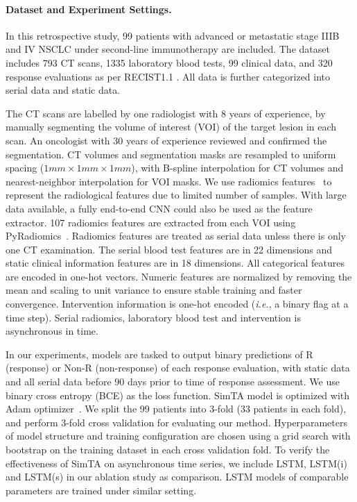 \documentclass[runningheads]{llncs}
\newcommand{\ie}{\textit{i.e.}}
\begin{document}
\paragraph{\textbf{Dataset and Experiment Settings.}}

In this retrospective study, 99 patients with advanced or metastatic stage IIIB and IV NSCLC under second-line immunotherapy are included. The dataset includes 793 CT scans, 1335 laboratory blood tests, 99 clinical data, and 320 response evaluations as per RECIST1.1 \cite{Eisenhauer2009NewRE}. All data is further categorized into serial data and static data.

The CT scans are labelled by one radiologist with 8 years of experience, by manually segmenting the volume of interest (VOI) of the target lesion in each scan. An oncologist with 30 years of experience reviewed and confirmed the segmentation. CT volumes and segmentation masks are resampled to uniform spacing ($1mm \times 1mm \times 1mm$), with B-spline interpolation for CT volumes and nearest-neighbor interpolation for VOI masks. We use radiomics features~\cite{Gillies2016RadiomicsIA} to represent the radiological features due to limited number of samples. With large data available, a fully end-to-end CNN could also be used as the feature extractor. 107 radiomics features are extracted from each VOI using PyRadiomics~\cite{Griethuysen2017ComputationalRS}. Radiomics features are treated as serial data unless there is only one CT examination. The serial blood test features are in 22 dimensions and static clinical information features are in 18 dimensions. All categorical features are encoded in one-hot vectors. Numeric features are normalized by removing the mean and scaling to unit variance to ensure stable training and faster convergence. Intervention information is one-hot encoded (\ie, a binary flag at a time step). Serial radiomics, laboratory blood test and intervention is asynchronous in time.

In our experiments, models are tasked to output binary predictions of R (response) or Non-R (non-response) of each response evaluation, with static data and all serial data before 90 days prior to time of response assessment. We use binary cross entropy (BCE) as the loss function. SimTA model is optimized with Adam optimizer~\cite{Kingma2014AdamAM}. We split the 99 patients into 3-fold (33 patients in each fold), and perform 3-fold cross validation for evaluating our method. Hyperparameters of model structure and training configuration are chosen using a grid search with bootstrap on the training dataset in each cross validation fold. To verify the effectiveness of SimTA on asynchronous time series, we include LSTM, LSTM(i) and LSTM(s) in our ablation study as comparison. LSTM models of comparable parameters are trained under similar setting.
\end{document}
